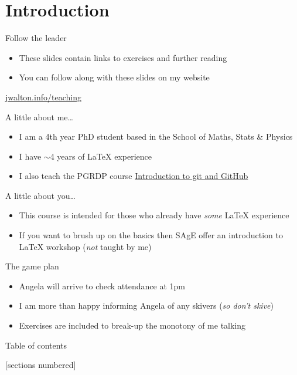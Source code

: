 \section*{Introduction}

\begin{frame}{Follow the leader}
  \begin{itemize}
    \item These slides contain links to exercises and further reading
    \item You can follow along with these slides on my website
  \end{itemize}  
  \centering\Large \href{https://jwalton.info/teaching/}{jwalton.info/teaching}
\end{frame}

\begin{frame}{A little about me\ldots}
  \begin{itemize}
    \item I am a 4th year PhD student based in the School of Maths, Stats
      \& Physics
    \item I have $\sim$4 years of \LaTeX{} experience
    \item I also teach the PGRDP course
      \href{https://workshops.ncl.ac.uk/view/book/modal/43153/}%
      {Introduction to git and GitHub}
  \end{itemize}
\end{frame}

\begin{frame}{A little about you\ldots}
  \begin{itemize}
    \item This course is intended for those who already have \emph{some} \LaTeX{} 
      experience
    \item If you want to brush up on the basics then SAgE offer an
      introduction to \LaTeX{} workshop (\emph{not} taught by me)
  \end{itemize}
\end{frame}

\begin{frame}{The game plan}
  \begin{itemize}
    \item Angela will arrive to check attendance at 1pm
    \item I am more than happy informing Angela of any skivers 
      (\emph{so don't skive})
    \item Exercises are included to break-up the monotony of me talking
  \end{itemize}
\end{frame}

\begin{frame}{Table of contents}
  [sections numbered]
  \tableofcontents[hideallsubsections]
\end{frame}

